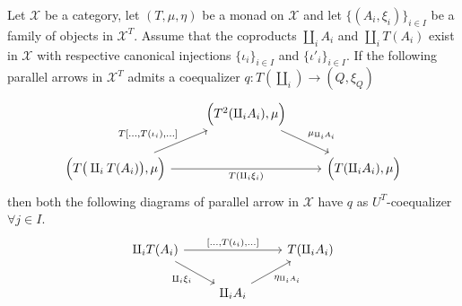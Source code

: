 \begin{mainbox}{}
\begin{prop}\label{coeq for the three diagrams}
    Let $\mathcal{X}$ be a category, let $(T,\mu,\eta)$ be a monad on $\mathcal{X}$ and let $\{(A_i,\xi_i)\}_{i\in I}$ be a family of objects in $\mathcal{X}^T$. Assume that the coproducts $\amalg_iA_i$ and $\amalg_iT(A_i)$ exist in $\mathcal{X}$ with respective canonical injections $\{\iota_i\}_{i\in I}$ and $\{\iota'_i\}_{i\in I}$. If the following parallel arrows in 
    $\mathcal{X}^T$ admits a coequalizer $q:T(\amalg_i)\to (Q,\xi_Q)$
    \begin{equation}\label{diagr 1 coproducts}
\begin{tikzcd}
                                                                                                                  & {\Big(T^2(\amalg_iA_i),\mu\Big)} \arrow[rd, "\mu_{\amalg_iA_i}"] &                              \\
{\Big(T\big(\amalg_iT(A_i)\big),\mu\Big)} \arrow[rr, "T(\amalg_i\xi_i)"'] \arrow[ru, "{T[\ldots,T(\iota_i),\ldots]}"] &                                                              & {\Big(T(\amalg_iA_i),\mu\Big)}
\end{tikzcd}
\end{equation}
    then both the following diagrams of parallel arrow in $\mathcal{X}$ have $q$ as $U^T$-coequalizer $\forall j \in I$.
\begin{equation}\label{diagr 2 coproducts}
\begin{tikzcd}
\amalg_iT(A_i) \arrow[rr, "{[\ldots,T(\iota_i),\ldots]}"] \arrow[rd, "\amalg_i \xi_i"'] &                                           & T(\amalg_iA_i) \\
                                                                                    & \amalg_iA_i \arrow[ru, "\eta_{\amalg_iA_i}"'] &             
\end{tikzcd}
\end{equation}


\end{prop}
\end{mainbox}
